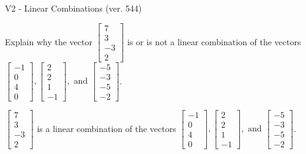 \begin{exercise}
  \begin{exerciseTitle}V2 - Linear Combinations (ver. 544)\end{exerciseTitle}
  \begin{exerciseStatement}
    Explain why the vector \(\left[\begin{array}{c}
7 \\
3 \\
-3 \\
2
\end{array}\right]\)  is or is not a linear 
	combination of the vectors \(\left[\begin{array}{c}
-1 \\
0 \\
4 \\
0
\end{array}\right] , \left[\begin{array}{c}
2 \\
2 \\
1 \\
-1
\end{array}\right] , \text{ and } \left[\begin{array}{c}
-5 \\
-3 \\
-5 \\
-2
\end{array}\right]\).
	


  \end{exerciseStatement}
  \begin{exerciseAnswer}
   \(\left[\begin{array}{c}
7 \\
3 \\
-3 \\
2
\end{array}\right]\) 
  	 is  
	a linear combination of the vectors \(\left[\begin{array}{c}
-1 \\
0 \\
4 \\
0
\end{array}\right] , \left[\begin{array}{c}
2 \\
2 \\
1 \\
-1
\end{array}\right] , \text{ and } \left[\begin{array}{c}
-5 \\
-3 \\
-5 \\
-2
\end{array}\right]\).

	
  


  \end{exerciseAnswer}
\end{exercise}